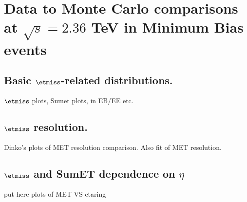 \section{Data to Monte Carlo comparisons at $\sqrt{s}=2.36$ TeV in
  Minimum Bias events}


\subsection{Basic $\etmiss$-related distributions.}
$\etmiss$ plots, Sumet plots, in EB/EE etc.

\subsection{$\etmiss$ resolution.}
Dinko's plots of MET resolution comparison. Also fit of MET resolution.

\subsection{$\etmiss$ and SumET dependence on $\eta$}
put here plots of MET VS etaring

